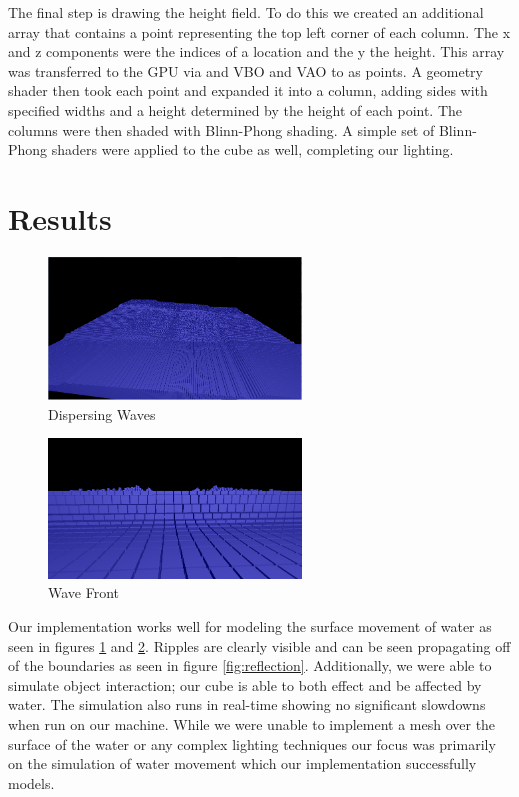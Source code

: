 \documentclass[11pt]{article}
\begin{document}
The final step is drawing the height field.  To do this we created an additional array that contains a point representing the top left corner of each column.  The x and z components were the indices of a location and the y the height.  This array was transferred to the GPU via and VBO and VAO to as points.  A geometry shader then took each point and expanded it into a column, adding sides with specified widths and a height determined by the height of each point.  The columns were then shaded with Blinn-Phong shading.  A simple set of Blinn-Phong shaders were applied to the cube as well, completing our lighting.

\section{Results}

\begin{figure}[H]
    \caption{Dispersing Waves}
    \label{fig:waves}
    \centering
    \includegraphics[width=0.6\textwidth]{../www/images/waterWaves}
\end{figure}

\begin{figure}[H]
    \caption{Wave Front}
    \label{fig:front}
    \centering
    \includegraphics[width=0.6\textwidth]{../www/images/waveFront}
\end{figure}

Our implementation works well for modeling the surface movement of water as 
seen in figures \ref{fig:waves} and \ref{fig:front}. Ripples are clearly 
visible and can be seen propagating off of the boundaries as seen in figure 
\ref{fig:reflection}. Additionally, we were able to simulate object 
interaction; our cube is able to both effect and be affected by water.  The 
simulation also runs in real-time showing no significant slowdowns when run on 
our machine. While we were unable to implement a mesh over the surface of the 
water or any complex lighting techniques our focus was primarily on the 
simulation of water movement which our implementation successfully models.
\end{document}
